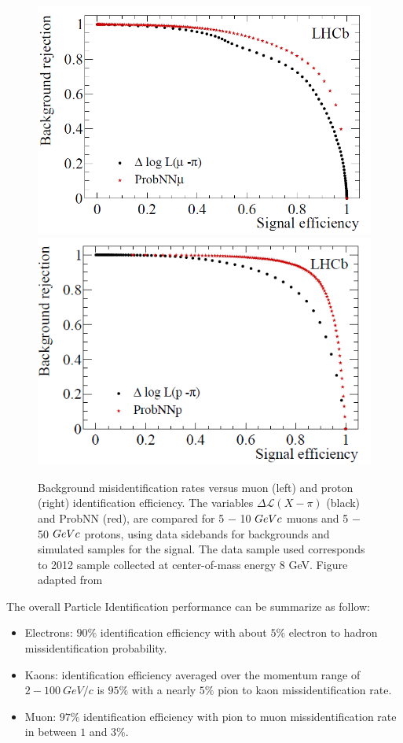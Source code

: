 \begin{figure}[h]
 \begin{center}
  \includegraphics[width=0.49\linewidth]{figures/PID_prob_left.PNG}
   \includegraphics[width=0.49\linewidth]{figures/PID_prob_right.PNG}
    \caption{Background misidentification rates versus muon (left) and proton (right)
identification efficiency. The variables $\Delta \mathcal{L} (X −\pi)$
(black) and ProbNN (red), are compared for 5 − 10 $GeV\/c$ muons and 5 − 50 $GeV\/c$ protons,
using data sidebands for backgrounds and simulated samples for the signal. The data sample
used corresponds to 2012 sample collected at center-of-mass energy 8 GeV. Figure adapted from \cite{PID}}%
\label{fig:PID baseline}%
 \end{center}
\end{figure}

The overall Particle Identification performance can be summarize as follow:

\begin{itemize}
    \item Electrons: $90\%$ identification efficiency with about $5\%$ electron to hadron missidentification probability. 
    \item Kaons: identification efficiency averaged over the momentum range of\\ $2-100~ GeV/c$ is $95\%$ with a nearly $5\%$ pion to kaon missidentification rate. 
    \item Muon: $97\%$ identification efficiency with pion to muon missidentification rate in between $1$ and $3\%$.  
\end{itemize}


